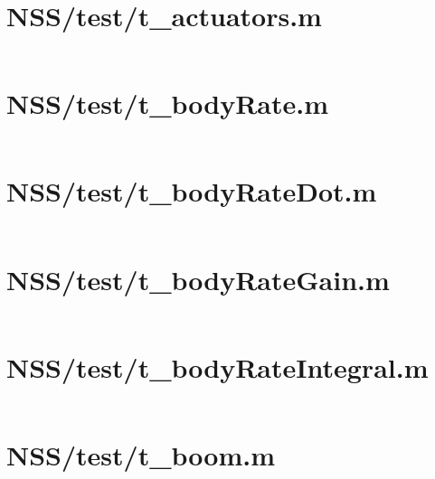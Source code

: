 \pagebreak
\section*{NSS/test/t\_actuators.m}\label{code:NSS/test/t_actuators.m}
\inputminted[linenos,fontsize=\scriptsize]{matlab}{/home/dcouture/git/mathyourlife/TSatPy/beta_versions/matlab_object_oriented/test/t_actuators.m}

\pagebreak
\section*{NSS/test/t\_bodyRate.m}\label{code:NSS/test/t_bodyRate.m}
\inputminted[linenos,fontsize=\scriptsize]{matlab}{/home/dcouture/git/mathyourlife/TSatPy/beta_versions/matlab_object_oriented/test/t_bodyRate.m}

\pagebreak
\section*{NSS/test/t\_bodyRateDot.m}\label{code:NSS/test/t_bodyRateDot.m}
\inputminted[linenos,fontsize=\scriptsize]{matlab}{/home/dcouture/git/mathyourlife/TSatPy/beta_versions/matlab_object_oriented/test/t_bodyRateDot.m}

\pagebreak
\section*{NSS/test/t\_bodyRateGain.m}\label{code:NSS/test/t_bodyRateGain.m}
\inputminted[linenos,fontsize=\scriptsize]{matlab}{/home/dcouture/git/mathyourlife/TSatPy/beta_versions/matlab_object_oriented/test/t_bodyRateGain.m}

\pagebreak
\section*{NSS/test/t\_bodyRateIntegral.m}\label{code:NSS/test/t_bodyRateIntegral.m}
\inputminted[linenos,fontsize=\scriptsize]{matlab}{/home/dcouture/git/mathyourlife/TSatPy/beta_versions/matlab_object_oriented/test/t_bodyRateIntegral.m}

\pagebreak
\section*{NSS/test/t\_boom.m}\label{code:NSS/test/t_boom.m}
\inputminted[linenos,fontsize=\scriptsize]{matlab}{/home/dcouture/git/mathyourlife/TSatPy/beta_versions/matlab_object_oriented/test/t_boom.m}

\pagebreak
